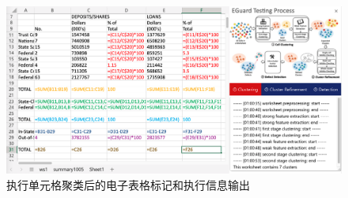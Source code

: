 \begin{figure}[tp]   
    \centering
    \includegraphics[width=\textwidth]{figure/eg/eguard-2.png}
    \caption{\eg 执行单元格聚类后的电子表格标记和执行信息输出}
    \label{figure-eg2}
\end{figure}